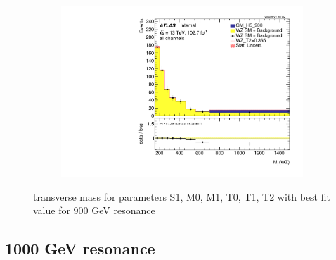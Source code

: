 \documentclass[../Bachelorarbeit.tex]{subfiles}
\begin{document}
\begin{figure}[h]
\begin{subfigure}{0.45\textwidth}
    \end{subfigure}
    \begin{subfigure}{0.45\textwidth}
        \includegraphics[width=\textwidth]{Plots/ALL_MTWZ_right_color/GM_H5_900/T2/2022-05-07/VBSSR/all_VV_MTWZ.pdf}
    \end{subfigure}

    \caption{transverse mass for parameters S1, M0, M1, T0, T1, T2 with best fit value for 900 GeV resonance}
    \label{fig:all_mtwz_900}
\end{figure}
\pagebreak
\newpage

\subsection{1000 GeV resonance}
\end{document}
